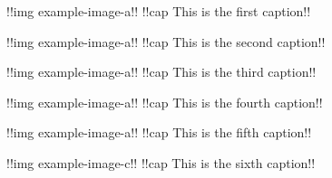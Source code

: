 \documentclass{article}
\begin{document}
\begin{multiimages}
  !!img example-image-a!! 
  !!cap This is the first caption!!

  !!img example-image-a!!
  !!cap This is the second caption!!

  !!img example-image-a!!
  !!cap This is the third caption!!

  !!img example-image-a!!
  !!cap This is the fourth caption!!

  !!img example-image-a!!
  !!cap This is the fifth caption!!

  !!img example-image-c!!
  !!cap This is the sixth caption!!
\end{multiimages}
\end{document}
